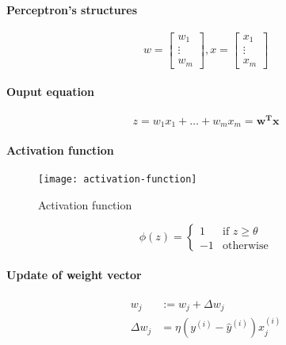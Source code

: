 \documentclass{article}
\begin{document}
			\paragraph{Perceptron's structures}
			\begin{equation}
				w = \begin{bmatrix}
						w_1 \\
						\vdots \\
						w_m
					\end{bmatrix}, x =
					\begin{bmatrix}
						x_1 \\
						\vdots \\
						x_m
					\end{bmatrix}
			\end{equation}

			\paragraph{Ouput equation}
			\begin{equation}
				z = w_1 x_1 + \dots + w_m x_m = \boldsymbol{w^T x}
			\end{equation}


			\paragraph{Activation function}

			\begin{figure}
				\centering
				\texttt{[image: activation-function]}
				\caption{Activation function}
				\label{fig:activation-function}
			\end{figure}

			\begin{equation}
				\phi(z) = \begin{cases}
					1 &\mbox{if } z \geq \theta \\
					-1 &\mbox{otherwise}
				\end{cases}
			\end{equation}

			\paragraph{Update of weight vector}

			\begin{align}
					w_j &:= w_j + \Delta w_j \\
					\Delta w_j &= \eta(y^{(i)} - \hat{y}^{(i)}) x^{(i)}_j
			\end{align}
\end{document}
